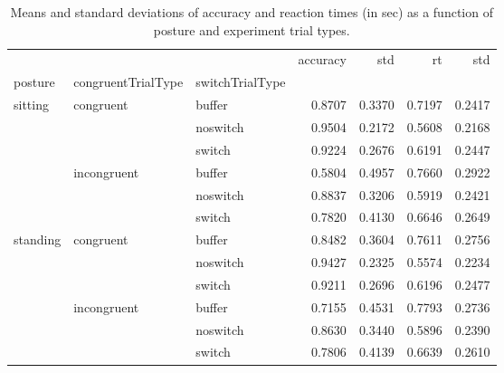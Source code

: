 \begin{table}
\centering
\caption{Means and standard deviations of accuracy and reaction times (in sec) as a function of posture and experiment trial types.}
\label{table-task-switching-replication-reaction-time}
\begin{tabular}{lllrrrr}
\toprule
         &             &        & accuracy &    std &     rt &    std \\
posture & congruentTrialType & switchTrialType &          &        &        &        \\
\midrule
sitting & congruent & buffer &   0.8707 & 0.3370 & 0.7197 & 0.2417 \\
         &             & noswitch &   0.9504 & 0.2172 & 0.5608 & 0.2168 \\
         &             & switch &   0.9224 & 0.2676 & 0.6191 & 0.2447 \\
         & incongruent & buffer &   0.5804 & 0.4957 & 0.7660 & 0.2922 \\
         &             & noswitch &   0.8837 & 0.3206 & 0.5919 & 0.2421 \\
         &             & switch &   0.7820 & 0.4130 & 0.6646 & 0.2649 \\
standing & congruent & buffer &   0.8482 & 0.3604 & 0.7611 & 0.2756 \\
         &             & noswitch &   0.9427 & 0.2325 & 0.5574 & 0.2234 \\
         &             & switch &   0.9211 & 0.2696 & 0.6196 & 0.2477 \\
         & incongruent & buffer &   0.7155 & 0.4531 & 0.7793 & 0.2736 \\
         &             & noswitch &   0.8630 & 0.3440 & 0.5896 & 0.2390 \\
         &             & switch &   0.7806 & 0.4139 & 0.6639 & 0.2610 \\
\bottomrule
\end{tabular}
\end{table}
